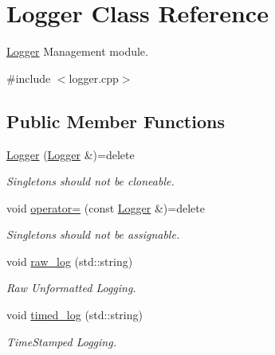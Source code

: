 \hypertarget{classLogger}{}\section{Logger Class Reference}
\label{classLogger}


\mbox{\hyperlink{classLogger}{Logger}} Management module.  




{\ttfamily \#include $<$logger.\+cpp$>$}

\subsection*{Public Member Functions}
\begin{DoxyCompactItemize}
\item 
\mbox{\label{classLogger_a96a909eca2542e2f1e9cb5ec73798be7}} 
\mbox{\hyperlink{classLogger_a96a909eca2542e2f1e9cb5ec73798be7}{Logger}} (\mbox{\hyperlink{classLogger}{Logger}} \&)=delete
\begin{DoxyCompactList}\small\item\em Singletons should not be cloneable. \end{DoxyCompactList}\item 
\mbox{\label{classLogger_af7266f0b4cc9b6c05a20fb76b96c4ada}} 
void \mbox{\hyperlink{classLogger_af7266f0b4cc9b6c05a20fb76b96c4ada}{operator=}} (const \mbox{\hyperlink{classLogger}{Logger}} \&)=delete
\begin{DoxyCompactList}\small\item\em Singletons should not be assignable. \end{DoxyCompactList}\item 
\mbox{\label{classLogger_a850c792e9a22c5bde830b3ea672ee52f}} 
void \mbox{\hyperlink{classLogger_a850c792e9a22c5bde830b3ea672ee52f}{raw\+\_\+log}} (std\+::string)
\begin{DoxyCompactList}\small\item\em Raw Unformatted Logging. \end{DoxyCompactList}\item 
\mbox{\label{classLogger_a031840b005d6689cb7994695036b0921}} 
void \mbox{\hyperlink{classLogger_a031840b005d6689cb7994695036b0921}{timed\+\_\+log}} (std\+::string)
\begin{DoxyCompactList}\small\item\em Time\+Stamped Logging. \end{DoxyCompactList}\item 

\end{DoxyCompactItemize}

